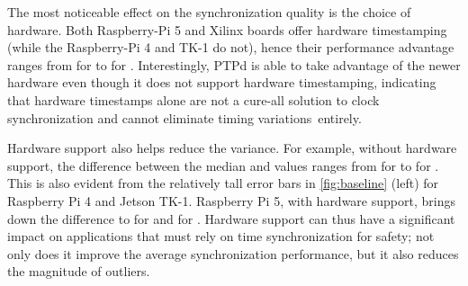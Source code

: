
The most noticeable effect on the synchronization quality is the choice of
hardware.
Both Raspberry-Pi 5 and Xilinx boards offer hardware timestamping
(while the Raspberry-Pi 4 and TK-1 do not),
hence their performance advantage ranges from \fRatio{\cmpMin} for
\fVendor{\cmpMinArg} to \fRatio{\cmpMax} for \fVendor{\cmpMaxArg}.
Interestingly, PTPd is able to take advantage of the newer hardware
even though it does not support hardware timestamping,
indicating that hardware timestamps alone are not a cure-all solution to
clock synchronization and cannot eliminate timing variations~entirely.


Hardware support also helps reduce the variance.
For example, without hardware support,
the difference between the median and \PNineFive{} values ranges from
\fRatio{\cmpMin} for \fVendor{\cmpMinArg} to \fRatio{\cmpMax} for \fVendor{\cmpMaxArg}.
This is also evident from the relatively tall error bars in
\cref{fig:baseline} (left) for Raspberry Pi 4 and Jetson \mbox{TK-1}.
Raspberry Pi 5, with hardware support, brings down the difference to
%
\fRatio[1]{\cmpMax} for \fVendor{\cmpMaxArg} and \fRatio[1]{\cmpMin} for \fVendor{\cmpMinArg}.
Hardware support can thus have a significant impact
on applications that must rely on time synchronization for safety;
not only does it improve the average synchronization performance,
but it also reduces the magnitude of outliers.

